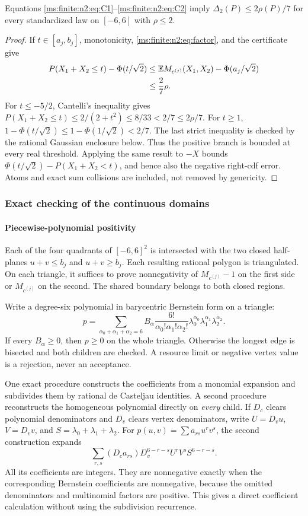 \begin{lemma}\label{ms:finite:n2:lem:certimp}
Equations \eqref{ms:finite:n2:eq:C1}--\eqref{ms:finite:n2:eq:C2} imply
$\Delta_2(P)\le2\rho(P)/7$ for every standardized law on $[-6,6]$ with
$\rho\le2$.
\end{lemma}
\begin{proof}
If $t\in[a_j,b_j]$, monotonicity, \eqref{ms:finite:n2:eq:factor}, and the certificate give
\begin{align*}
 P(X_1+X_2\le t)-\Phi(t/\sqrt2)
 &\le\mathbb E M_{c^{(j)}}(X_1,X_2)-\Phi(a_j/\sqrt2)\\
 &\le\frac27\rho.
\end{align*}
For $t\le-5/2$, Cantelli's inequality gives
$P(X_1+X_2\le t)\le2/(2+t^2)\le8/33<2/7\le2\rho/7$.
For $t\ge1$, $1-\Phi(t/\sqrt2)\le1-\Phi(1/\sqrt2)<2/7$.
The last strict inequality is checked by the rational Gaussian enclosure below.
Thus the positive branch is bounded at every real threshold.
Applying the same result to $-X$ bounds
$\Phi(t/\sqrt2)-P(X_1+X_2<t)$, and hence also the negative right-cdf error.
Atoms and exact sum collisions are included, not removed by genericity.
\end{proof}

\subsubsection{Exact checking of the continuous domains}
\paragraph{Piecewise-polynomial positivity}
Each of the four quadrants of $[-6,6]^2$ is intersected with the two closed
half-planes $u+v\le b_j$ and $u+v\ge b_j$. Each resulting rational polygon is
triangulated. On each triangle, it suffices to prove nonnegativity of
$M_{c^{(j)}}-1$ on the first side or $M_{c^{(j)}}$ on the second.
The shared boundary belongs to both closed regions.

Write a degree-six polynomial in barycentric Bernstein form on a triangle:
\[
 p=\sum_{\alpha_0+\alpha_1+\alpha_2=6}
 B_\alpha\frac{6!}{\alpha_0!\alpha_1!\alpha_2!}
 \lambda_0^{\alpha_0}\lambda_1^{\alpha_1}\lambda_2^{\alpha_2}.
\]
If every $B_\alpha\ge0$, then $p\ge0$ on the whole triangle. Otherwise the
longest edge is bisected and both children are checked. A resource limit or
negative vertex value is a rejection, never an acceptance.

One exact procedure constructs the coefficients from a monomial expansion
and subdivides them by rational de Casteljau identities. A second procedure
reconstructs the homogeneous polynomial directly on \emph{every} child.
If $D_c$ clears polynomial denominators and $D_v$ clears vertex denominators,
write $U=D_vu$, $V=D_vv$, and $S=\lambda_0+\lambda_1+\lambda_2$.
For $p(u,v)=\sum a_{rs}u^rv^s$, the second construction expands
\[
 \sum_{r,s}(D_ca_{rs})D_v^{6-r-s}U^rV^sS^{6-r-s}.
\]
All its coefficients are integers. They are nonnegative exactly when the
corresponding Bernstein coefficients are nonnegative, because the omitted
denominators and multinomial factors are positive. This gives a direct
coefficient calculation without using the subdivision recurrence.

